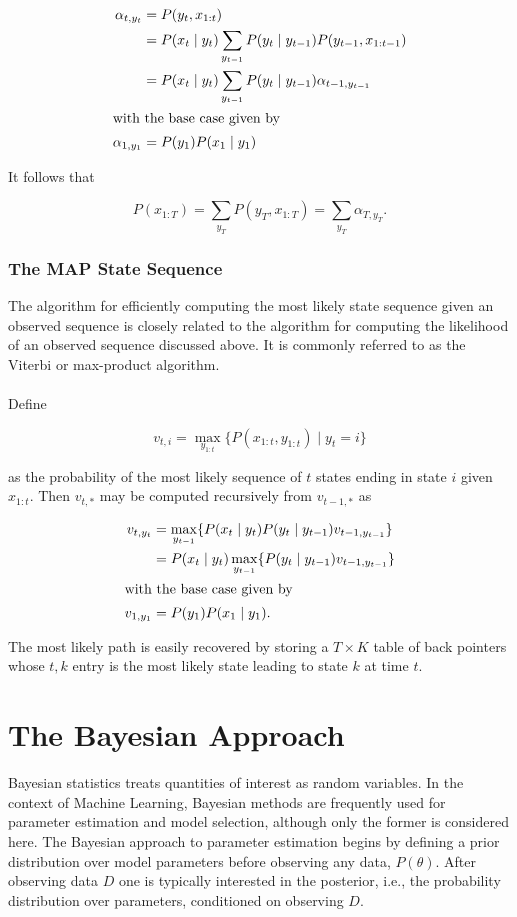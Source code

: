 \documentclass[12pt]{report}
\newcommand{\1}[0]{\mathbbm{1}}
\newcommand{\seq}[3]{\ensuremath{#1_{{#2}:{#3}}}}
\begin{document}
\begin{align*}
    \alpha_{t,y_t}
    &= P(y_t, \seq{x}{1}{t}) \\
    &= P(x_t \mid y_t) \sum_{y_{t-1}} P(y_t \mid y_{t-1}) P(y_{t-1}, \seq{x}{1}{t-1}) \\
    &= P(x_t \mid y_t) \sum_{y_{t-1}} P(y_t \mid y_{t-1}) \alpha_{t-1,y_{t-1}} \\
\intertext{with the base case given by}
    \alpha_{1,y_1} &= P(y_1)P(x_1 \mid y_1)\\
\end{align*}

It follows that 

\[
    P(\seq{x}{1}{T}) = \sum_{y_T} P(y_T, \seq{x}{1}{T}) = \sum_{y_T} \alpha_{T,y_T}.
\]

\subsubsection{The \ac{MAP} State Sequence}
The algorithm for efficiently computing the most likely state sequence given an 
observed sequence is closely related to the algorithm for computing the likelihood 
of an observed sequence discussed above. 
It is commonly referred to as the Viterbi or max-product algorithm.
\\\\
Define 

\[
    v_{t,i} = \max_{\seq{y}{1}{t}}\{P(\seq{x}{1}{t}, \seq{y}{1}{t}) \mid y_t = i\}
\] 

as the probability of the most likely sequence of $t$ states ending in state $i$ 
given $\seq{x}{1}{t}$. Then $v_{t,*}$ may be computed recursively from $v_{t-1,*}$ as

\begin{align*}
    v_{t,y_t} 
    &= \max_{y_{t-1}}\{ P(x_{t} \mid y_t) P(y_t \mid y_{t-1}) v_{t-1,y_{t-1}} \} \\
    &= P(x_t \mid y_t) \max_{y_{t-1}}\{ P(y_t \mid y_{t-1}) v_{t-1,y_{t-1}} \} \\
\intertext{with the base case given by}
    v_{1,y_1} &= P(y_1)P(x_1 \mid y_1).
\end{align*}

The most likely path is easily recovered by storing a $T \times K$ table of back pointers 
whose $t,k$ entry is the most likely state leading to state $k$ at time $t$.

\section{The Bayesian Approach}
Bayesian statistics treats quantities of interest as random variables. 
In the context of Machine Learning, Bayesian methods are frequently used 
for parameter estimation and model selection, although only the former is 
considered here. The Bayesian approach to parameter estimation begins by 
defining a prior distribution over model parameters before observing any data, 
$P(\theta)$. After observing data $D$ one is typically interested in the 
posterior, i.e., the probability distribution over parameters, conditioned on observing
$D$.
\end{document}
